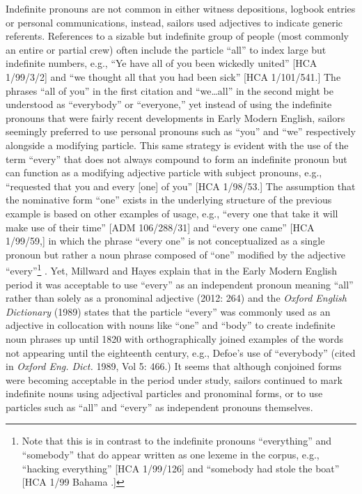   Indefinite pronouns are not common in either witness depositions, logbook entries or personal communications, instead, sailors used adjectives to indicate generic referents. References to a sizable but indefinite group of people (most commonly an entire or partial crew) often include the particle “all” to index large but indefinite numbers, e.g., “Ye have all of you been wickedly united” [HCA 1/99/3/2] and “we thought all that you had been sick” [HCA 1/101/541.] The phrases “all of you” in the first citation and “we…all” in the second might be understood as “everybody” or “everyone,” yet instead of using the indefinite pronouns that were fairly recent developments in Early Modern English, sailors seemingly preferred to use personal pronouns such as “you” and “we” respectively alongside a modifying particle. This same strategy is evident with the use of the term “every” that does not always compound to form an indefinite pronoun but can function as a modifying adjective particle with subject pronouns, e.g., “requested that you and every [one] of you” [HCA 1/98/53.] The assumption that the nominative form “one” exists in the underlying structure of the previous example is based on other examples of usage, e.g., “every one that take it will make use of their time” [ADM 106/288/31] and “every one came” [HCA 1/99/59,] in which the phrase “every one” is not conceptualized as a single pronoun but rather a noun phrase composed of “one” modified by the adjective “every”\footnote{Note that this is in contrast to the indefinite pronouns “everything” and “somebody” that do appear written as one lexeme in the corpus, e.g., “hacking everything” [HCA 1/99/126] and “somebody had stole the boat” [HCA 1/99 Bahama \citealt{Islands1722}.]} . Yet, Millward and Hayes explain that in the Early Modern English period it was acceptable to use “every” as an independent pronoun meaning “all” rather than solely as a pronominal adjective (2012: 264) and the \textit{Oxford English Dictionary} (1989) states that the particle “every” was commonly used as an adjective in collocation with nouns like “one” and “body” to create indefinite noun phrases up until 1820 with orthographically joined examples of the words not appearing until the eighteenth century, e.g.,  Defoe’s use of “everybody” (cited in \textit{Oxford Eng. Dict.} 1989, Vol 5: 466.) It seems that although conjoined forms were becoming acceptable in the period under study, sailors continued to mark indefinite nouns using adjectival particles and pronominal forms, or to use particles such as “all” and “every” as independent pronouns themselves.

